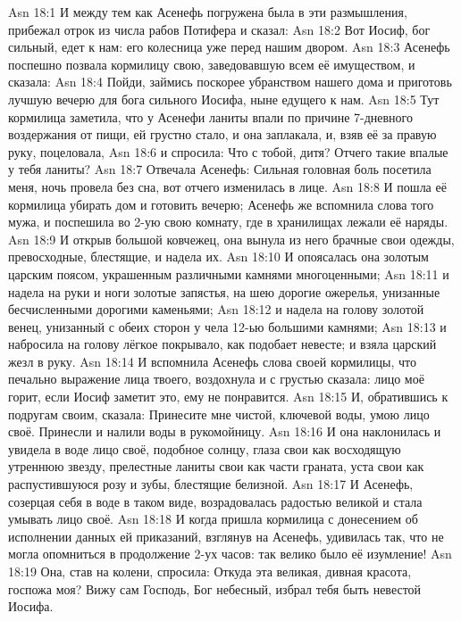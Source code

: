 \vs Asn 18:1
И между тем как Асенефь
погружена была в эти размышления, прибежал отрок из числа рабов Потифера и
сказал:
\vs Asn 18:2
Вот Иосиф, бог сильный,
едет к нам: его колесница уже перед нашим двором.
\vs Asn 18:3
Асенефь поспешно позвала
кормилицу свою, заведовавшую всем её имуществом, и сказала:
\vs Asn 18:4
Пойди, займись поскорее
убранством нашего дома и приготовь лучшую вечерю для бога сильного Иосифа, ныне
едущего к нам.
\vs Asn 18:5
Тут кормилица заметила, что
у Асенефи ланиты впали по причине 7-дневного воздержания от пищи, ей грустно
стало, и она заплакала, и, взяв её за правую руку, поцеловала,
\vs Asn 18:6
и спросила: Что с тобой, дитя?
Отчего такие впалые у тебя ланиты?
\vs Asn 18:7
Отвечала Асенефь:
Сильная головная боль посетила меня,
ночь провела без сна, вот отчего изменилась в лице.
\vs Asn 18:8
И пошла её кормилица убирать дом и готовить вечерю;
Асенефь же вспомнила слова того мужа, и поспешила
во 2-ую свою комнату, где в хранилищах лежали её наряды.
\vs Asn 18:9
И открыв большой ковчежец,
она вынула из него брачные свои одежды, превосходные, блестящие, и надела их.
\vs Asn 18:10
И опоясалась она золотым царским поясом,
украшенным различными камнями многоценными;
\vs Asn 18:11
и надела на руки и ноги
золотые запястья, на шею дорогие ожерелья, унизанные бесчисленными дорогими
каменьями;
\vs Asn 18:12
и надела на голову золотой
венец, унизанный с обеих сторон у чела 12-ью большими камнями;
\vs Asn 18:13
и набросила на голову
лёгкое покрывало, как подобает невесте; и взяла царский жезл в руку.
\vs Asn 18:14
И вспомнила Асенефь слова
своей кормилицы, что печально выражение лица твоего, воздохнула и с грустью
сказала: лицо моё горит, если Иосиф заметит это, ему не понравится.
\vs Asn 18:15
И, обратившись к подругам
своим, сказала: Принесите мне чистой, ключевой воды, умою лицо своё.
Принесли и налили воды в рукомойницу.
\vs Asn 18:16
И она наклонилась и
увидела в воде лицо своё, подобное солнцу, глаза свои как восходящую утреннюю
звезду, прелестные ланиты свои как части граната, уста свои как
распустившуюся розу и зубы, блестящие белизной.
\vs Asn 18:17
И Асенефь, созерцая себя в
воде в таком виде, возрадовалась радостью великой и стала умывать лицо своё.
\vs Asn 18:18
И когда пришла кормилица с
донесением об исполнении данных ей приказаний, взглянув на Асенефь, удивилась
так, что не могла опомниться в продолжение 2-ух часов:
так велико было её изумление!
\vs Asn 18:19
Она, став на колени, спросила:
Откуда эта великая, дивная красота, госпожа моя?
Вижу сам Господь, Бог небесный, избрал тебя быть невестой Иосифа.

